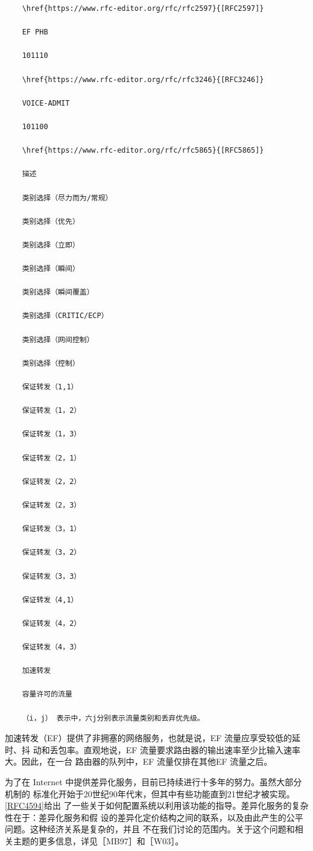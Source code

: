 \begin{verbatim}
    \href{https://www.rfc-editor.org/rfc/rfc2597}{[RFC2597]}
    
    EF PHB
    
    101110
    
    \href{https://www.rfc-editor.org/rfc/rfc3246}{[RFC3246]}
    
    VOICE-ADMIT
    
    101100
    
    \href{https://www.rfc-editor.org/rfc/rfc5865}{[RFC5865]}
    
    描述
    
    类别选择（尽力而为/常规）
    
    类别选择（优先）
    
    类别选择（立即）
    
    类别选择（瞬间）
    
    类别选择（瞬间覆盖）
    
    类别选择（CRITIC/ECP）
    
    类别选择（网间控制）
    
    类别选择（控制）
    
    保证转发（1,1）
    
    保证转发（1，2）
    
    保证转发（1，3）
    
    保证转发（2，1）
    
    保证转发（2，2）
    
    保证转发（2，3）
    
    保证转发（3，1）
    
    保证转发（3，2）
    
    保证转发（3，3）
    
    保证转发（4,1）
    
    保证转发（4，2）
    
    保证转发（4，3）
    
    加速转发
    
    容量许可的流量
    
    （i，j） 表示中，六j分别表示流量类别和丢弃优先级。
\end{verbatim}

加速转发（EF）提供了非拥塞的网络服务，也就是说，EF 流量应享受较低的延时、抖
动和丢包率。直观地说，EF 流量要求路由器的输出速率至少比输入速率大。因此，在一台
路由器的队列中，EF 流量仅排在其他EF 流量之后。

为了在 Internet 中提供差异化服务，目前已持续进行十多年的努力。虽然大部分机制的
标准化开始于20世纪90年代末，但其中有些功能直到21世纪才被实现。\href{https://www.rfc-editor.org/rfc/rfc4594}{[RFC4594]}给出
了一些关于如何配置系统以利用该功能的指导。差异化服务的复杂性在于：差异化服务和假
设的差异化定价结构之间的联系，以及由此产生的公平问题。这种经济关系是复杂的，并且
不在我们讨论的范围内。关于这个问题和相关主题的更多信息，详见［MB97］和［W03］。

